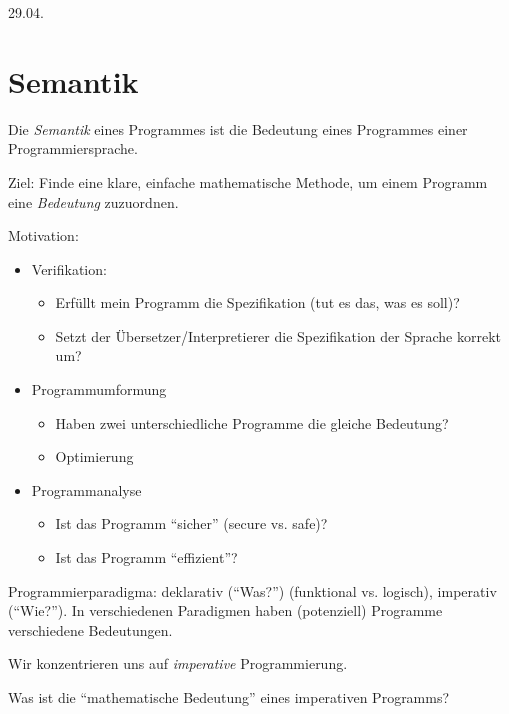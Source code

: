 \newpage
\hfill 29.04.

\section{Semantik} \label{sec:semantik}

Die \emph{Semantik} eines Programmes ist die Bedeutung eines Programmes einer Programmiersprache.

Ziel: Finde eine klare, einfache mathematische Methode, um einem Programm eine \emph{Bedeutung} zuzuordnen.

Motivation:
\begin{itemize}
    \item Verifikation:
        \begin{itemize}
            \item Erfüllt mein Programm die Spezifikation (tut es das, was es soll)?
            \item Setzt der Übersetzer/Interpretierer die Spezifikation der Sprache korrekt um?
        \end{itemize}
     \item Programmumformung
        \begin{itemize}
            \item Haben zwei unterschiedliche Programme die gleiche Bedeutung?
            \item Optimierung
        \end{itemize}
    \item Programmanalyse
        \begin{itemize}
            \item Ist das Programm ``sicher'' (secure vs. safe)?
            \item Ist das Programm ``effizient''?
        \end{itemize}
\end{itemize}

\begin{definition}[Programmierparadigma]
    Programmierparadigma: \zb deklarativ (``Was?'') (funktional vs. logisch), imperativ (``Wie?''). In verschiedenen Paradigmen haben (potenziell) Programme verschiedene Bedeutungen.
\end{definition}

Wir konzentrieren uns auf \emph{imperative} Programmierung.

\begin{question}
    Was ist die ``mathematische Bedeutung'' eines imperativen Programms?
\end{question}

